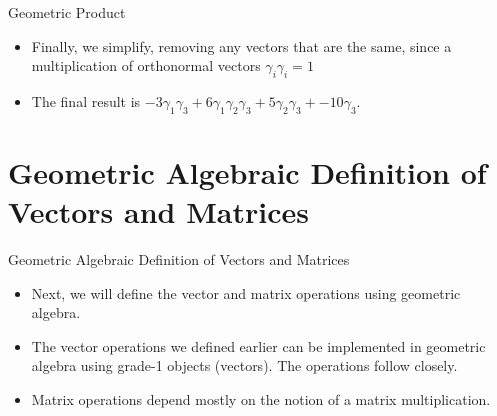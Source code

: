 \documentclass[aspectratio=169,xcolor=dvipsnames]{beamer}
\begin{document}
\begin{frame}{Geometric Product}
\begin{itemize}
      \item<2> Finally, we simplify, removing any vectors that are the same, since
            a multiplication of orthonormal vectors $\gamma_i\gamma_i = 1$
      \item<2> The final result is $-3\gamma_1\gamma_3 + 6\gamma_1\gamma_2\gamma_3 + 5\gamma_2\gamma_3 + -10\gamma_3$.

\end{itemize}
\end{frame}
      



\section{Geometric Algebraic Definition of Vectors and Matrices}

\begin{frame}{Geometric Algebraic Definition of Vectors and Matrices}
    \begin{itemize}
      \item Next, we will define the vector and matrix operations using geometric
            algebra.
      \item The vector operations we defined earlier can be implemented in geometric 
            algebra using grade-1 objects (vectors). The operations follow closely.
      \item Matrix operations depend mostly on the notion of a matrix multiplication.
    \end{itemize}
\end{frame}

\end{document}
